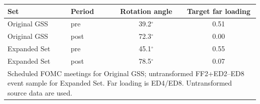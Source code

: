 \begin{tabular}{llcc}
\toprule
Set & Period & Rotation angle & Target far loading \\
\midrule
Original GSS & pre & 39.2$^\circ$ & 0.51 \\
Original GSS & post & 72.3$^\circ$ & 0.00 \\
\midrule
Expanded Set & pre & 45.1$^\circ$ & 0.55 \\
Expanded Set & post & 78.5$^\circ$ & 0.07 \\
\midrule
\multicolumn{4}{p{0.62\linewidth}}{\footnotesize Scheduled FOMC meetings for Original GSS; untransformed FF2+ED2--ED8 event sample for Expanded Set. Far loading is ED4/ED8. Untransformed source data are used.}\\
\bottomrule
\end{tabular}
